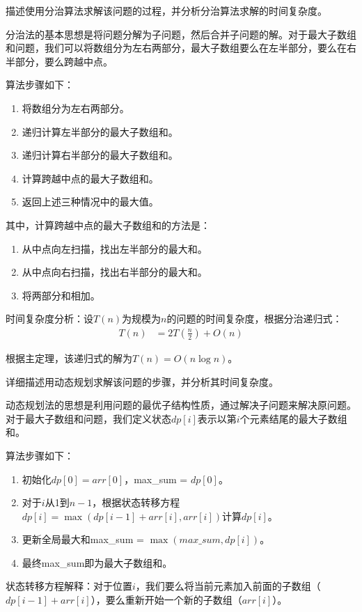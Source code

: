 \documentclass[12pt,twoside]{article}
\begin{document}
\begin{problems}
\ppart 描述使用分治算法求解该问题的过程，并分析分治算法求解的时间复杂度。

分治法的基本思想是将问题分解为子问题，然后合并子问题的解。对于最大子数组和问题，我们可以将数组分为左右两部分，最大子数组要么在左半部分，要么在右半部分，要么跨越中点。

算法步骤如下：
\begin{enumerate}
    \item 将数组分为左右两部分。
    \item 递归计算左半部分的最大子数组和。
    \item 递归计算右半部分的最大子数组和。
    \item 计算跨越中点的最大子数组和。
    \item 返回上述三种情况中的最大值。
\end{enumerate}

其中，计算跨越中点的最大子数组和的方法是：
\begin{enumerate}
    \item 从中点向左扫描，找出左半部分的最大和。
    \item 从中点向右扫描，找出右半部分的最大和。
    \item 将两部分和相加。
\end{enumerate}

时间复杂度分析：设$T(n)$为规模为$n$的问题的时间复杂度，根据分治递归式：
\begin{align}
T(n) &= 2T(\frac{n}{2}) + O(n) 
\end{align}

根据主定理，该递归式的解为$T(n) = O(n\log n)$。

\ppart 详细描述用动态规划求解该问题的步骤，并分析其时间复杂度。

动态规划法的思想是利用问题的最优子结构性质，通过解决子问题来解决原问题。对于最大子数组和问题，我们定义状态$dp[i]$表示以第$i$个元素结尾的最大子数组和。

算法步骤如下：
\begin{enumerate}
    \item 初始化$dp[0] = arr[0]$，max\_sum = $dp[0]$。
    \item 对于$i$从1到$n-1$，根据状态转移方程$dp[i] = \max(dp[i-1] + arr[i], arr[i])$计算$dp[i]$。
    \item 更新全局最大和max\_sum = $\max(max\_sum, dp[i])$。
    \item 最终max\_sum即为最大子数组和。
\end{enumerate}

状态转移方程解释：对于位置$i$，我们要么将当前元素加入前面的子数组（$dp[i-1] + arr[i]$），要么重新开始一个新的子数组（$arr[i]$）。


\end{problems}
\end{document}
